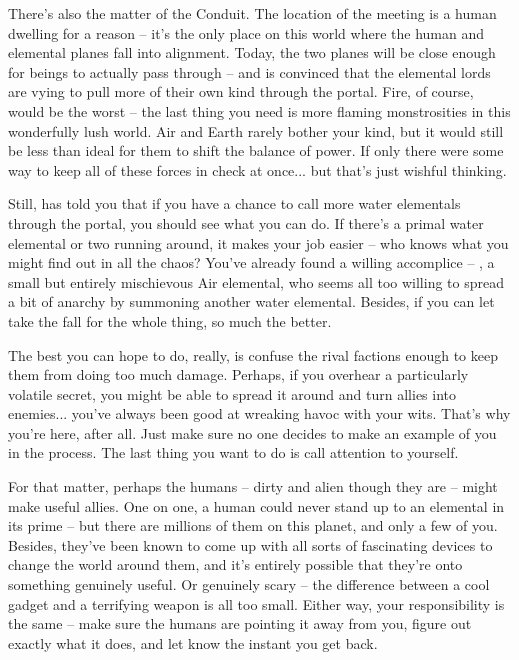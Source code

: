 \documentclass[char]{elementals}
\begin{document}
There's also the matter of the Conduit. The location of the meeting is a human dwelling for a reason -- it's the only place on this world where the human and elemental planes fall into alignment. Today, the two planes will be close enough for beings to actually pass through -- and \cWaterQueen{} is convinced that the elemental lords are vying to pull more of their own kind through the portal. Fire, of course, would be the worst -- the last thing you need is more flaming monstrosities in this wonderfully lush world. Air and Earth rarely bother your kind, but it would still be less than ideal for them to shift the balance of power. If only there were some way to keep all of these forces in check at once... but that's just wishful thinking. 

Still, \cWaterQueen{} has told you that if you have a chance to call more water elementals through the portal, you should see what you can do. If there's a primal water elemental or two running around, it makes your job easier -- who knows what you might find out in all the chaos? You've already found a willing accomplice -- \cMiniAir{\intro}, a small but entirely mischievous Air elemental, who seems all too willing to spread a bit of anarchy by summoning another water elemental. Besides, if you can let \cMiniAir{\them} take the fall for the whole thing, so much the better.

The best you can hope to do, really, is confuse the rival factions enough to keep them from doing too much damage. Perhaps, if you overhear a particularly volatile secret, you might be able to spread it around and turn allies into enemies... you've always been good at wreaking havoc with your wits. That's why you're here, after all. Just make sure no one decides to make an example of you in the process. The last thing you want to do is call attention to yourself.

For that matter, perhaps the humans -- dirty and alien though they are -- might make useful allies. One on one, a human could never stand up to an elemental in its prime -- but there are millions of them on this planet, and only a few of you. Besides, they've been known to come up with all sorts of fascinating devices to change the world around them, and it's entirely possible that they're onto something genuinely useful. Or genuinely scary -- the difference between a cool gadget and a terrifying weapon is all too small. Either way, your responsibility is the same -- make sure the humans are pointing it away from you, figure out exactly what it does, and let \cWaterQueen{} know the instant you get back.
\end{document}
